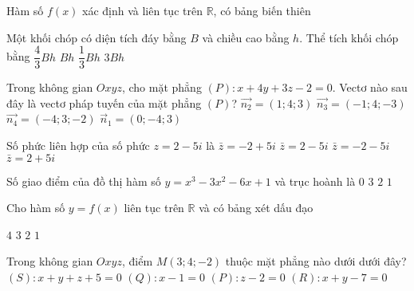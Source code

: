 \begin{ex}%
Hàm số $f(x)$ xác định và liên tục trên $\mathbb{R}$, có bảng biến thiên 
{

}

\end{ex}
\begin{ex}%
Một khối chóp có diện tích đáy bằng $B$ và chiều cao bằng $h$. Thể tích khối chóp bằng
\choice
{$\dfrac{4}{3} B h$}
{$B h$}
{\True $\dfrac{1}{3} B h$}
{$3 B h$}

\end{ex}
\begin{ex}%
Trong không gian $O x y z$, cho mặt phẳng $(P)\colon x+4 y+3 z-2=0$. Vectơ nào sau đây là vectơ pháp tuyến của mặt phẳng $(P)$?
\choice
{\True $\overrightarrow{n_2}=(1; 4; 3)$}
{$\overrightarrow{n_3}=(-1; 4;-3)$}
{$\overrightarrow{n_4}=(-4; 3;-2)$}
{$\vec{n}_1=(0;-4; 3)$}

\end{ex}
\begin{ex}%
Số phức liên hợp của số phức $z=2-5 i$ là
\choice
{$\bar{z}=-2+5 i$}
{$\bar{z}=2-5 i$}
{$\bar{z}=-2-5 i$}
{\True $\bar{z}=2+5 i$}

\end{ex}
\begin{ex}%
Số giao điểm của đồ thị hàm số $y=x^3-3 x^2-6 x+1$ và trục hoành là
\choice
{$0$}
{\True $3$}
{$2$}
{$1$}

\end{ex}
\begin{ex}%
Cho hàm số $y=f(x)$ liên tục trên $\mathbb{R}$ và có bảng xét dấu đạo 
{
}
\choice
{\True $4$}
{$3$}
{$2$}
{$1$}
\end{ex}
\begin{ex}%
Trong không gian $O x y z$, điểm $M(3; 4;-2)$ thuộc mặt phẳng nào dưới dưới đây?
\choice
{$(S)\colon x+y+z+5=0$}
{$(Q)\colon x-1=0$}
{$(P)\colon z-2=0$}
{\True $(R)\colon x+y-7=0$}

\end{ex}
